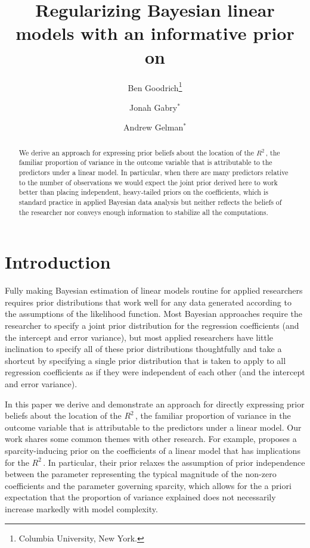 \documentclass[11pt]{article}
\title{\bf Regularizing Bayesian linear models with an informative prior on \Rsq
    \vspace{.1in}}
\author{Ben Goodrich\footnote{Columbia University, New York.}
    \and Jonah Gabry$^\ast$
    \and Andrew Gelman$^\ast$
    \vspace{.1in}}
\newcommand{\Rsq}{$R^2\,$}
\begin{document}
\maketitle
\thispagestyle{empty}

\begin{abstract}
\noindent We derive an approach for expressing prior beliefs about the location
of the \Rsq, the familiar proportion of variance in the outcome variable that is
attributable to the predictors under a linear model. In particular, when there
are many predictors relative to the number of observations we would expect the
joint prior derived here to work better than placing independent, heavy-tailed
priors on the coefficients, which is  standard practice in applied Bayesian data
analysis but neither reflects the beliefs of the researcher nor conveys enough
information to stabilize all the computations.
\end{abstract}


\section{Introduction}

Fully making Bayesian estimation of linear models routine for applied
researchers requires prior distributions that work well for any data generated
according to the assumptions of the likelihood function. Most Bayesian
approaches require the researcher to specify a joint prior distribution for the
regression coefficients (and the intercept and error variance), but most applied
researchers have little inclination to specify all of these prior distributions
thoughtfully and take a shortcut by specifying a single prior distribution that
is taken to apply to all regression coefficients as if they were independent of
each other (and the intercept and error variance).

In this paper we derive and demonstrate an approach for directly expressing
prior beliefs about the location of the \Rsq, the familiar proportion of
variance in the outcome variable that is attributable to the predictors under a
linear model. Our work shares some common themes with other research. For
example,  proposes a sparcity-inducing prior on the
coefficients of a linear model that has implications for the \Rsq. In
particular, their prior relaxes the assumption of prior independence between the
parameter representing the typical magnitude of the non-zero coefficients and
the parameter governing sparcity, which allows for the a priori expectation that
the proportion of variance explained does not necessarily increase markedly with
model complexity.
\end{document}
